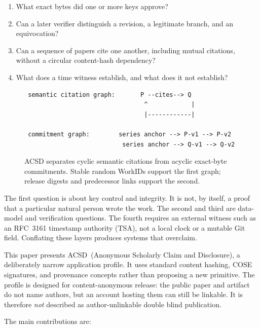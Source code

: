 \documentclass[11pt]{article}
\newcommand{\acsd}{\textsc{ACSD}}
\begin{document}
\begin{enumerate}
  \item What exact bytes did one or more keys approve?
  \item Can a later verifier distinguish a revision, a legitimate branch, and an equivocation?
  \item Can a sequence of papers cite one another, including mutual citations, without a circular content-hash dependency?
  \item What does a time witness establish, and what does it not establish?
\end{enumerate}

\begin{figure}[t]
\centering
\begin{verbatim}
 semantic citation graph:       P --cites--> Q
                                 ^            |
                                 |------------|

 commitment graph:        series anchor --> P-v1 --> P-v2
                           series anchor --> Q-v1 --> Q-v2
\end{verbatim}
\caption{ACSD separates cyclic semantic citations from acyclic exact-byte
commitments. Stable random WorkIDs support the first graph; release digests and
predecessor links support the second.}
\end{figure}

The first question is about key control and integrity. It is not, by itself, a proof that a particular natural person wrote the work. The second and third are data-model and verification questions. The fourth requires an external witness such as an RFC~3161 timestamp authority (TSA), not a local clock or a mutable Git field. Conflating these layers produces systems that overclaim.

This paper presents \acsd\ (Anonymous Scholarly Claim and Disclosure), a deliberately narrow application profile. It uses standard content hashing, COSE signatures, and provenance concepts rather than proposing a new primitive. The profile is designed for content-anonymous release: the public paper and artifact do not name authors, but an account hosting them can still be linkable. It is therefore \emph{not} described as author-unlinkable double blind publication.

The main contributions are:
\end{document}
